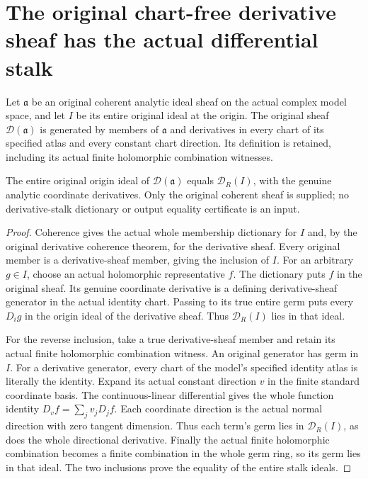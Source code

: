 \section{The original chart-free derivative sheaf has the actual differential stalk}

Let $\mathfrak a$ be an original coherent analytic ideal sheaf on the actual
complex model space, and let $I$ be its entire original ideal at the origin.
The original sheaf $\mathcal D(\mathfrak a)$ is generated by members of
$\mathfrak a$ and derivatives in every chart of its specified atlas and every
constant chart direction. Its definition is retained, including its actual
finite holomorphic combination witnesses.

\begin{theorem}
\label{hir:actual-original-derivative-sheaf-whole-stalk}
\leanok
The entire original origin ideal of $\mathcal D(\mathfrak a)$ equals
$\mathcal D_R(I)$, with the genuine analytic coordinate derivatives.
Only the original coherent sheaf is supplied; no derivative-stalk dictionary
or output equality certificate is an input.
\end{theorem}
\begin{proof}
Coherence gives the actual whole membership dictionary for $I$ and, by the
original derivative coherence theorem, for the derivative sheaf. Every
original member is a derivative-sheaf member, giving the inclusion of $I$.
For an arbitrary $g\in I$, choose an actual holomorphic representative $f$.
The dictionary puts $f$ in the original sheaf. Its genuine coordinate
derivative is a defining derivative-sheaf generator in the actual identity
chart. Passing to its true entire germ puts every $D_i g$ in the origin
ideal of the derivative sheaf. Thus $\mathcal D_R(I)$ lies in that ideal.

For the reverse inclusion, take a true derivative-sheaf member and retain
its actual finite holomorphic combination witness. An original generator
has germ in $I$. For a derivative generator, every chart of the model's
specified identity atlas is literally the identity. Expand its actual
constant direction $v$ in the finite standard coordinate basis. The
continuous-linear differential gives the whole function identity
$D_v f=\sum_j v_jD_jf$. Each coordinate direction is the actual normal
direction with zero tangent dimension. Thus each term's germ lies in
$\mathcal D_R(I)$, as does the whole directional derivative. Finally the
actual finite holomorphic combination becomes a finite combination in the
whole germ ring, so its germ lies in that ideal. The two inclusions prove
the equality of the entire stalk ideals.
\end{proof}

